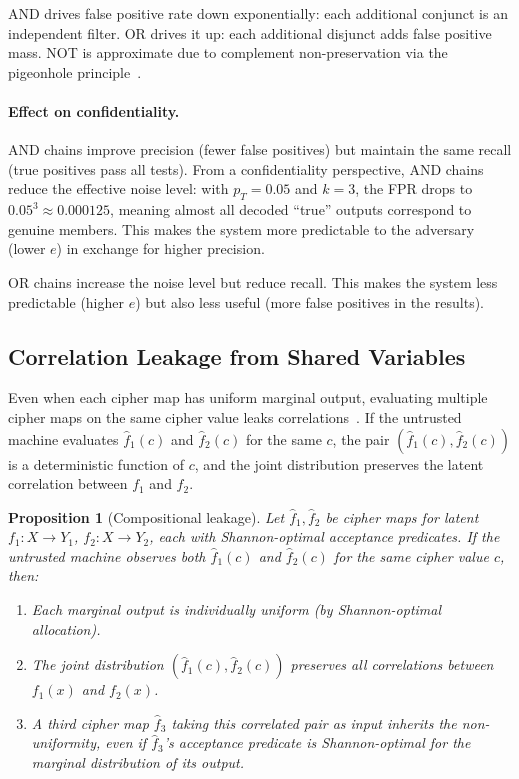 \documentclass[11pt]{article}
\theoremstyle{definition}
\theoremstyle{plain}
\newtheorem{proposition}[theorem]{Proposition}
\theoremstyle{remark}
\newcommand{\fhat}{\hat{f}}
\begin{document}
AND drives false positive rate down exponentially: each additional
conjunct is an independent filter.  OR drives it up: each additional
disjunct adds false positive mass.  NOT is approximate due to
complement non-preservation via the pigeonhole
principle~\cite{towell2026cipher}.

\paragraph{Effect on confidentiality.}
AND chains improve precision (fewer false positives) but maintain the
same recall (true positives pass all tests).  From a confidentiality
perspective, AND chains reduce the effective noise level: with
$p_T = 0.05$ and $k = 3$, the FPR drops to $0.05^3 \approx 0.000125$,
meaning almost all decoded ``true'' outputs correspond to genuine
members.  This makes the system more predictable to the adversary (lower
$e$) in exchange for higher precision.

OR chains increase the noise level but reduce recall.  This makes the
system less predictable (higher $e$) but also less useful (more false
positives in the results).

\subsection{Correlation Leakage from Shared Variables}

Even when each cipher map has uniform marginal output, evaluating multiple
cipher maps on the same cipher value leaks
correlations~\cite[Sec.~9.2]{towell2026cipher}.  If the untrusted machine
evaluates $\fhat_1(c)$ and $\fhat_2(c)$ for the same $c$, the pair
$(\fhat_1(c), \fhat_2(c))$ is a deterministic function of $c$, and the
joint distribution preserves the latent correlation between $f_1$ and
$f_2$.

\begin{proposition}[Compositional leakage]
\label{prop:comp-leakage}
Let $\fhat_1, \fhat_2$ be cipher maps for latent $f_1 : X \to Y_1$,
$f_2 : X \to Y_2$, each with Shannon-optimal acceptance predicates.  If
the untrusted machine observes both $\fhat_1(c)$ and $\fhat_2(c)$ for the
same cipher value $c$, then:
\begin{enumerate}
\item Each marginal output is individually uniform (by Shannon-optimal
  allocation).
\item The joint distribution $(\fhat_1(c), \fhat_2(c))$ preserves all
  correlations between $f_1(x)$ and $f_2(x)$.
\item A third cipher map $\fhat_3$ taking this correlated pair as input
  inherits the non-uniformity, even if $\fhat_3$'s acceptance predicate
  is Shannon-optimal for the marginal distribution of its output.
\end{enumerate}
\end{proposition}
\end{document}
